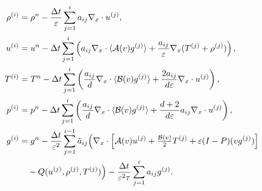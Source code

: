 \documentclass[final,11pt]{siamart251216}
\numberwithin{equation}{section}
\theoremstyle{definition}
\theoremstyle{remark}
\begin{document}
\begin{align}
\label{InternalStages}
\rho^{(i)} &= \rho^n - \frac{\Delta t}{\varepsilon} \sum_{j = 1}^i a_{ij} \nabla_x \cdot u^{(j)}, \nonumber \\
u^{(i)} &= u^n - \Delta t  \sum_{j = 1}^i \left( a_{ij} \nabla_x \cdot \langle \mathcal{A}(v) g^{(j)} \rangle  + \frac{a_{ij}}{\varepsilon} \nabla_x (T^{(j)} + \rho^{(j)})\right), \nonumber \\
T^{(i)} &= T^n - \Delta t  \sum_{j = 1}^i \left( \frac{a_{ij}}{d} \nabla_x \cdot \langle \mathcal{B}(v) g^{(j)} \rangle  + \frac{2 a_{ij}}{d \varepsilon} \nabla_x \cdot u^{(j)}\right), \nonumber \\
p^{(i)} &= p^n - \Delta t  \sum_{j = 1}^i \left( \frac{a_{ij}}{d} \nabla_x \cdot \langle \mathcal{B}(v) g^{(j)} \rangle  + \frac{d+2}{d \varepsilon} a_{ij} \nabla_x \cdot u^{(j)}\right), \\
g^{(i)} &= g^n - \frac{\Delta t}{\varepsilon^2} \sum_{j=1}^{i-1} \tilde{a}_{ij} \Bigl( \nabla_x \cdot \left[ \mathcal{A}(v)u^{(j)} + \tfrac{\mathcal{B}(v)}{2}T^{(j)} + \varepsilon (I-P) (vg^{(j)})\right] \nonumber \\
&\quad - Q(u^{(j)},\rho^{(j)},T^{(j)}) \Bigr) - \frac{\Delta t}{\varepsilon^2 \tau} \sum_{j=1}^i a_{ij} g^{(j)}. \nonumber
\end{align}
\end{document}
